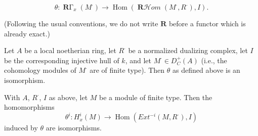 \documentclass[12pt]{book}
\DeclareMathOperator{\Hom}{Hom}
\DeclareMathOperator{\RHom}{\mathbf{R}\mathcal{H}\textit{om}}
\DeclareMathOperator{\RGamma}{\mathbf{R}\Gamma}
\begin{document}
\setcounter{page}{278}
\[\theta: \RGamma_{x}\left(M^{\cdot}\right) \to \Hom\left(\RHom\left(M^{\cdot}, R^{\cdot}\right), I\right) .\]

(Following the usual conventions, we do not write \(\mathbf{R}\) before a functor which is already exact.)

\begin{theorem}
Let \(A\) be a local noetherian ring, let \(R^{\cdot}\) be a normalized dualizing complex, let \(I\) be the corresponding injective hull of \(k\), and let \(M^{\cdot} \in D_{C}^{+}(A)\) (i.e., the cohomology modules of \(M^{\cdot}\) are of finite type). Then \(\theta\) as defined above is an isomorphism.
\end{theorem}

\begin{corollary}
With \(A\), \(R^{\cdot}\), \(I\) as above, let \(M\) be a module of finite type. Then the homomorphisms
\[\theta^{i}: H_{x}^{i}(M) \to \Hom\left(Ext^{-i}\left(M, R^{\cdot}\right), I\right)\]
induced by \(\theta\) are isomorphisms.
\end{corollary}
\end{document}
